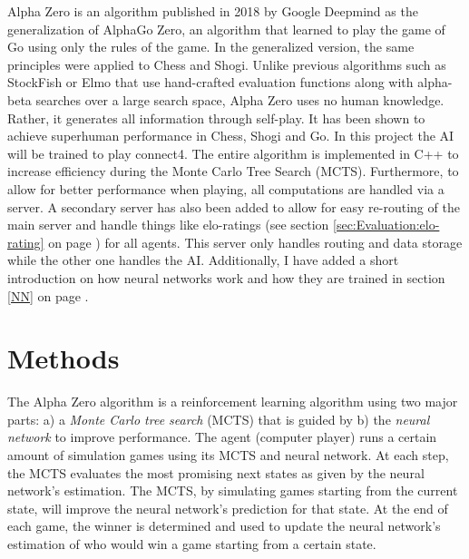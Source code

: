 \documentclass[12pt]{article}
\newcommand{\sectionref}[1]{section \ref{#1} on page \pageref{#1}}
\begin{document}
\maketitle
\begin{abstract}
\noindent Alpha Zero is an AI algorythem, that is capable of learning to play zero sum stated multiplayer games. These types of games include Go, Chess, Phi Sho and so forth. This is done by training a neural network and from data generated by a Monte Carlo Tree Serch. This document also explains how neural networks work and a short explenation of the infrastructure around the AI to allow for playing on remote devices.
~\cite{silver2018general}\cite{silver2017mastering}
\end{abstract}
\newpage
\tableofcontents
\newpage

Alpha Zero is an algorithm published in 2018 by Google Deepmind as the generalization of AlphaGo Zero, an algorithm that learned to play the game of Go using only the rules of the game. In the generalized version, the same principles were applied to Chess and Shogi. Unlike previous algorithms such as StockFish or Elmo that use hand-crafted evaluation functions along with alpha-beta searches over a large search space, Alpha Zero uses no human knowledge. Rather, it generates all information through self-play. It has been shown to achieve superhuman performance in Chess, Shogi and Go. In this project the AI will be trained to play connect4. The entire algorithm is implemented in C++ to increase efficiency during the Monte Carlo Tree Search (MCTS). Furthermore, to allow for better performance when playing, all computations are handled via a server. A secondary server has also been added to allow for easy re-routing of the main server and handle things like elo-ratings (see \sectionref{sec:Evaluation:elo-rating}) for all agents. This server only handles routing and data storage while the other one handles the AI. Additionally, I have added a short introduction on how neural networks work and how they are trained in \sectionref{NN}. 

\section{Methods}
\label{Methods}
The Alpha Zero algorithm is a reinforcement learning algorithm using two major parts: a) a {\it Monte Carlo tree search} (MCTS) that is guided by b) the {\it neural network} to improve performance.
The agent (computer player) runs a certain amount of simulation games using its MCTS and neural network. At each step, the MCTS evaluates the most promising next states as given by the neural network's estimation. The MCTS, by simulating games starting from the current state, will improve the neural network's prediction for that state. At the end of each game, the winner is determined and used to update the neural network's estimation of who would win a game starting from a certain state.
\end{document}
